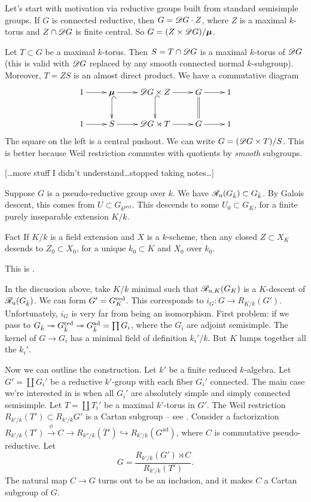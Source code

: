 Let's start with motivation via reductive groups built from standard semisimple 
groups. If $G$ is connected reductive, then $G=\mathscr{D} G\cdot Z$, where $Z$ is a 
maximal $k$-torus and $Z\cap \mathscr{D} G$ is finite central. So 
$G=(Z\times \mathscr{D} G)/\boldsymbol\mu$. 

Let $T\subset G$ be a maximal $k$-torus. Then $S=T\cap \mathscr{D} G$ is a maximal 
$k$-torus of $\mathscr{D} G$ (this is valid with $\mathscr{D} G$ replaced by any smooth 
connected normal $k$-subgroup). Moreover, $T = Z S$ is an almost direct product. 
We have a commutative diagram 
\[\xymatrix{
  1 \ar[r] 
    & \boldsymbol\mu \ar[r] \ar@{^{(}->}[d] 
    & \sD G\times Z \ar[r] \ar@{^{(}->}[d] 
    & G \ar[r] \ar@{=}[d] 
    & 1 \\
  1 \ar[r] 
    & S \ar[r] 
    & \sD G\rtimes T \ar[r] 
    & G \ar[r] 
    & 1
}\]
The square on the left is a central pushout. We can write 
$G=(\mathscr{D} G\times T)/S$. This is better because Weil restriction commutes with 
quotients by \emph{smooth} subgroups. 

[\ldots more stuff I didn't understand\ldots stopped taking notes\ldots]

Suppose $G$ is a pseudo-reductive group over $k$. We have 
$\mathscr{R}_{\mathrm{u}}(G_{\bar k})\subset G_{\bar k}$. By Galois descent, this comes from 
$U\subset G_{k^\mathrm{perf}}$. This descends to some $U_0\subset G_K$, for a 
finite purely inseparable extension $K/k$. 

\begin{enonce}{Fact}
If $K/k$ is a field extension and $X$ is a $k$-scheme, then any closed 
$Z\subset X_K$ desends to $Z_0\subset X_0$, for a unique 
$k_0\subset K$ and $X_0$ over $k_0$. 
\end{enonce}
This is \cite[4.8]{ega4}. 

In the discussion above, take $K/k$ minimal such that $\mathscr{R}_{\mathrm{u},K}(G_K)$ is a 
$K$-descent of $\mathscr{R}_{\mathrm{u}}(G_{\bar k})$. We can form 
$G'=G_K^{\mathrm{red}}$. This corresponds to 
$i_G:G\to R_{K/k}(G')$. Unfortunately, $i_G$ is very far from being an isomorphism. 
First problem: if we pass to $G_{\bar k} \twoheadrightarrow G_{\bar k}^{\mathrm{red}} \twoheadrightarrow G_{\bar k}^\mathrm{ad} = \prod G_i$, where the $G_i$ are adjoint 
semisimple. The kernel of $G\to G_i$ has a minimal field of definition 
$k_i'/k$. But $K$ lumps together all the $k_i'$. 

Now we can outline the construction. Let $k'$ be a finite reduced $k$-algebra. 
Let $G'=\coprod G_i'$ be a reductive $k'$-group with each fiber 
$G_i'$ connected. The main case we're interested in is when all $G_i'$ are 
absolutely simple and simply connected semisimple. Let 
$T=\coprod T_i'$ be a maximal $k'$-torus in $G'$. The Weil restriction 
$R_{k'/k}(T') \subset R_{k'/k} G'$ is a Cartan subgroup -- see 
\cite[A.5.15(i)]{cgp10}. Consider a factorization 
$R_{k'/k}(T')\xrightarrow\phi C \to R_{k''/k}(\overline T') \hookrightarrow R_{k'/k}(G^\mathrm{ad})$, where $C$ is commutative pseudo-reductive. Let 
\[
  G=\frac{R_{k'/k}(G')\rtimes C}{R_{k'/k}(T')}. 
\]
The natural map $C\to G$ turns out to be an inclusion, and it makes $C$ a 
Cartan subgroup of $G$. 

